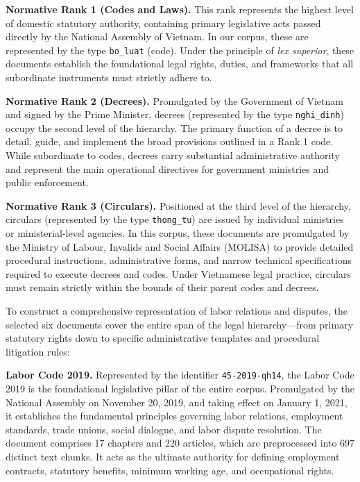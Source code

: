 \textbf{Normative Rank 1 (Codes and Laws).} This rank represents the highest level of domestic statutory authority, containing primary legislative acts passed directly by the National Assembly of Vietnam. In our corpus, these are represented by the type \texttt{bo\_luat} (code). Under the principle of \textit{lex superior}, these documents establish the foundational legal rights, duties, and frameworks that all subordinate instruments must strictly adhere to.

\textbf{Normative Rank 2 (Decrees).} Promulgated by the Government of Vietnam and signed by the Prime Minister, decrees (represented by the type \texttt{nghi\_dinh}) occupy the second level of the hierarchy. The primary function of a decree is to detail, guide, and implement the broad provisions outlined in a Rank 1 code. While subordinate to codes, decrees carry substantial administrative authority and represent the main operational directives for government ministries and public enforcement.

\textbf{Normative Rank 3 (Circulars).} Positioned at the third level of the hierarchy, circulars (represented by the type \texttt{thong\_tu}) are issued by individual ministries or ministerial-level agencies. In this corpus, these documents are promulgated by the Ministry of Labour, Invalids and Social Affairs (MOLISA) to provide detailed procedural instructions, administrative forms, and narrow technical specifications required to execute decrees and codes. Under Vietnamese legal practice, circulars must remain strictly within the bounds of their parent codes and decrees.

To construct a comprehensive representation of labor relations and disputes, the selected six documents cover the entire span of the legal hierarchy—from primary statutory rights down to specific administrative templates and procedural litigation rules:

\textbf{Labor Code 2019.} Represented by the identifier \texttt{45-2019-qh14}, the Labor Code 2019 is the foundational legislative pillar of the entire corpus. Promulgated by the National Assembly on November 20, 2019, and taking effect on January 1, 2021, it establishes the fundamental principles governing labor relations, employment standards, trade unions, social dialogue, and labor dispute resolution. The document comprises 17 chapters and 220 articles, which are preprocessed into 697 distinct text chunks. It acts as the ultimate authority for defining employment contracts, statutory benefits, minimum working age, and occupational rights.

